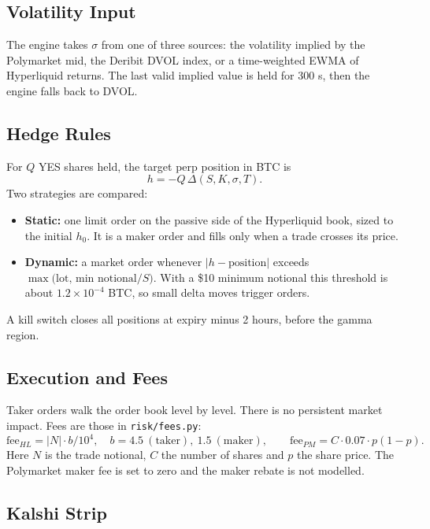 \documentclass[11pt,a4paper]{article}
\begin{document}
\subsection{Volatility Input}

The engine takes $\sigma$ from one of three sources: the volatility implied by the Polymarket mid, the Deribit DVOL index, or a time-weighted EWMA of Hyperliquid returns. The last valid implied value is held for 300 s, then the engine falls back to DVOL.

\subsection{Hedge Rules}

For $Q$ YES shares held, the target perp position in BTC is
\begin{equation}
h=-Q\,\Delta(S,K,\sigma,T).
\end{equation}
Two strategies are compared:
\begin{itemize}
\item \textbf{Static:} one limit order on the passive side of the Hyperliquid book, sized to the initial $h_0$. It is a maker order and fills only when a trade crosses its price.
\item \textbf{Dynamic:} a market order whenever $|h-\text{position}|$ exceeds $\max\!\big(\text{lot},\,\text{min notional}/S\big)$. With a \$10 minimum notional this threshold is about $1.2\times10^{-4}$ BTC, so small delta moves trigger orders.
\end{itemize}
A kill switch closes all positions at expiry minus 2 hours, before the gamma region.

\subsection{Execution and Fees}

Taker orders walk the order book level by level. There is no persistent market impact. Fees are those in \texttt{risk/fees.py}:
\begin{equation}
\text{fee}_{HL}=|N|\cdot b/10^4,\quad b=4.5\ (\text{taker}),\ 1.5\ (\text{maker}),
\qquad
\text{fee}_{PM}=C\cdot 0.07\cdot p(1-p).
\end{equation}
Here $N$ is the trade notional, $C$ the number of shares and $p$ the share price. The Polymarket maker fee is set to zero and the maker rebate is not modelled.

\subsection{Kalshi Strip}
\end{document}
